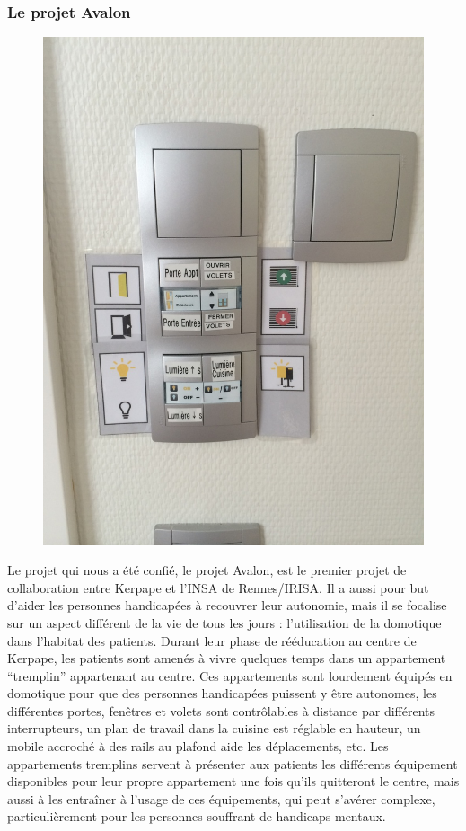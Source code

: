 \pagebreak
\subsubsection{Le projet Avalon}
\begin{figure}
	\centering
	\includegraphics[scale=0.2]{1-PreEtude/img/interrupteurs.jpeg}
\end{figure}
Le projet qui nous a été confié, le projet Avalon, est le premier projet de collaboration entre Kerpape et l'INSA de Rennes/IRISA. Il a aussi pour but d'aider les personnes handicapées à recouvrer leur autonomie, mais il se focalise sur un aspect différent de la vie de tous les jours : l'utilisation de la domotique dans l'habitat des patients. Durant leur phase de rééducation au centre de Kerpape, les patients sont amenés à vivre quelques temps dans un appartement \enquote{tremplin} appartenant au centre. Ces appartements sont lourdement équipés en domotique pour que des personnes handicapées puissent y être autonomes, les différentes portes, fenêtres et volets sont contrôlables à distance par différents interrupteurs, un plan de travail dans la cuisine est réglable en hauteur, un mobile accroché à des rails au plafond aide les déplacements, etc.
Les appartements tremplins servent à présenter aux patients les différents équipement disponibles pour leur propre appartement une fois qu'ils quitteront le centre, mais aussi à les entraîner à l'usage de ces équipements, qui peut s'avérer complexe, particulièrement pour les personnes souffrant de handicaps mentaux. \\

